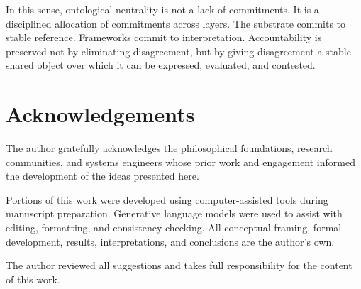 In this sense,
ontological neutrality is not a lack of commitments.
It is a disciplined allocation of commitments across layers.
The substrate commits to stable reference.
Frameworks commit to interpretation.
Accountability is preserved not by eliminating disagreement,
but by giving disagreement a stable shared object
over which it can be expressed, evaluated, and contested.

\medskip
\nopagebreak
\section*{Acknowledgements}

The author gratefully acknowledges the philosophical foundations,
research communities, and systems engineers whose prior work and engagement
informed the development of the ideas presented here.

Portions of this work were developed
using computer-assisted tools during manuscript preparation.
Generative language models were used to assist with editing, formatting,
and consistency checking.
All conceptual framing, formal development, results, interpretations, and conclusions
are the author's own.

The author reviewed all suggestions and
takes full responsibility for the content of this work.
